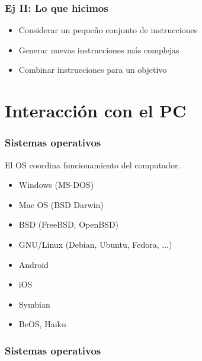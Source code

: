 \documentclass[14pt,aspectratio=169,xcolor=dvipsnames]{beamer}
\begin{document}
\begin{frame}\frametitle{Ej II: Lo que hicimos}
    \begin{itemize}
        \item Considerar un pequeño conjunto de instrucciones
        \item Generar nuevas instrucciones más complejas
        \item Combinar instrucciones para un objetivo
    \end{itemize}
\end{frame}
\section{Interacción con el PC}
\begin{frame}\frametitle{Sistemas operativos}
El OS coordina funcionamiento del computador. 
    \begin{itemize}
        \item<+-> Windows (MS-DOS)
        \item<+-> Mac OS (BSD Darwin)
        \item<+-> BSD (FreeBSD, OpenBSD)
        \item<+-> GNU/Linux (Debian, Ubuntu, Fedora, $\hdots$)
        \item<+-> Android
        \item<+-> iOS
        \item<+-> Symbian
        \item<+-> BeOS, Haiku
    \end{itemize}
\end{frame}
\begin{frame}\frametitle{Sistemas operativos}
    \begin{center}
    \end{center}
\end{frame}
\end{document}
